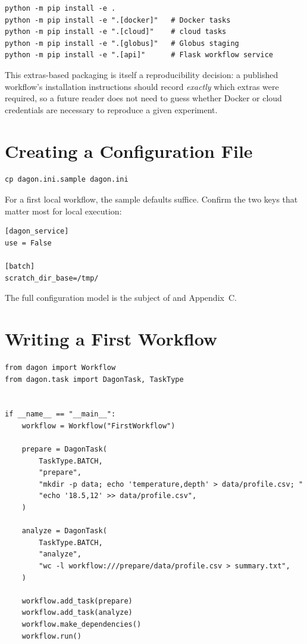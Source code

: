 \begin{lstlisting}[style=bash, caption={Minimal install with selective extras.}]
python -m pip install -e .
python -m pip install -e ".[docker]"   # Docker tasks
python -m pip install -e ".[cloud]"    # cloud tasks
python -m pip install -e ".[globus]"   # Globus staging
python -m pip install -e ".[api]"      # Flask workflow service
\end{lstlisting}

\begin{practicebox}
This extras-based packaging is itself a reproducibility decision: a published
workflow's installation instructions should record \emph{exactly} which
extras were required, so a future reader does not need to guess whether
Docker or cloud credentials are necessary to reproduce a given experiment.
\end{practicebox}

\section{Creating a Configuration File}

\begin{lstlisting}[style=bash]
cp dagon.ini.sample dagon.ini
\end{lstlisting}

For a first local workflow, the sample defaults suffice. Confirm the two keys
that matter most for local execution:

\begin{lstlisting}[style=ini]
[dagon_service]
use = False

[batch]
scratch_dir_base=/tmp/
\end{lstlisting}

The full configuration model is the subject of  and
Appendix~C.

\section{Writing a First Workflow}

\begin{lstlisting}[caption={\texttt{first\_workflow.py}: a two-task, data-oriented workflow.}]
from dagon import Workflow
from dagon.task import DagonTask, TaskType


if __name__ == "__main__":
    workflow = Workflow("FirstWorkflow")

    prepare = DagonTask(
        TaskType.BATCH,
        "prepare",
        "mkdir -p data; echo 'temperature,depth' > data/profile.csv; "
        "echo '18.5,12' >> data/profile.csv",
    )

    analyze = DagonTask(
        TaskType.BATCH,
        "analyze",
        "wc -l workflow:///prepare/data/profile.csv > summary.txt",
    )

    workflow.add_task(prepare)
    workflow.add_task(analyze)
    workflow.make_dependencies()
    workflow.run()
\end{lstlisting}

